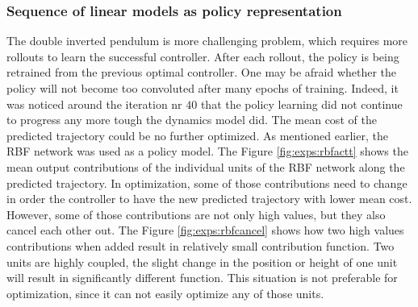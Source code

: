 \subsubsection{Sequence of linear models as policy representation}
\label{s:exps:double:policyrep}
The double inverted pendulum is more challenging problem, which requires more rollouts to learn the successful controller. After each rollout, the policy is being retrained from the previous optimal controller. One may be afraid whether the policy will not become too convoluted after many epochs of training. Indeed, it was noticed around the iteration nr $40$ that the policy learning did not continue to progress any more tough the dynamics model did. The mean cost of the predicted trajectory could be no further optimized. As mentioned earlier, the RBF network was used as a policy model. The Figure \ref{fig:exps:rbfactt} shows the mean output contributions of the individual units of the RBF network along the predicted trajectory. In optimization, some of those contributions need to change in order the controller to have the new predicted trajectory with lower mean cost. However, some of those contributions are not only high values, but they also cancel each other out. The Figure \ref{fig:exps:rbfcancel} shows how two high values contributions when added result in relatively small contribution function. Two units are highly coupled, the slight change in the position or height of one unit will result in significantly different function. This situation is not preferable for optimization, since it can not easily optimize any of those units. 


